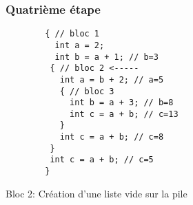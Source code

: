 \documentclass{../../res/univ-projet}
\begin{document}
    \subsubsection{Quatrième étape}
    \begin{multicols}{2}
        
        \begin{verbatim}
        { // bloc 1
          int a = 2;
          int b = a + 1; // b=3
         { // bloc 2 <-----
           int a = b + 2; // a=5
           { // bloc 3
             int b = a + 3; // b=8
             int c = a + b; // c=13
           }
           int c = a + b; // c=8
         }
         int c = a + b; // c=5
        }

        \end{verbatim}

      \columnbreak
        Bloc 2: Création d'une liste vide sur la pile
        
      \end{multicols}
\end{document}
